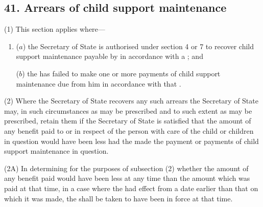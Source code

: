 \documentclass[12pt,a4paper]{article}
\begin{document}
\subsection{41. Arrears of child support maintenance}

(1) This section applies where---
\begin{enumerate}\item[]
($a$) the Secretary of State is authorised under section 4 or 7 to recover
child support maintenance payable by  in accordance with a ; and

($b$) the  has failed to make one or more
payments of child support maintenance due from him in accordance with
that .
\end{enumerate}

(2) Where the Secretary of State recovers any such arrears the Secretary of State may, in such circumstances as may be prescribed and to such extent as may be prescribed, retain them if the Secretary of State is satisfied that the amount of any benefit paid to or in respect of the person with care of the child or children in question would have been less had the  made the payment or payments of child support maintenance in question.

(2A) In determining for the purposes of subsection (2) whether the amount of any benefit paid would have been less at any time than the amount which was paid at that time, in a case where the  had effect from a date earlier than that on which it was made, the  shall be taken to have been in force at that time.
\end{document}

